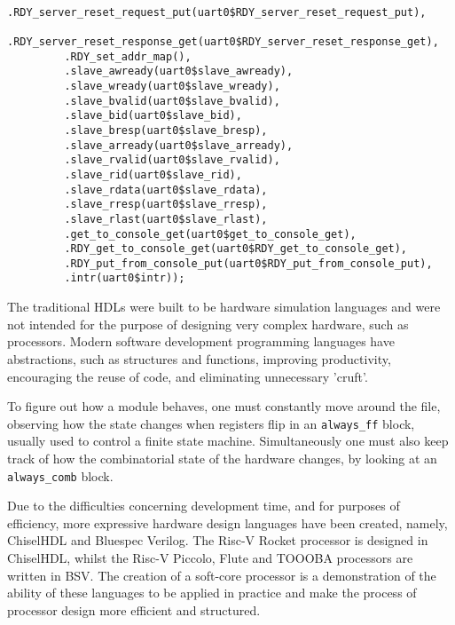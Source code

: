 \documentclass[a4paper,8pt]{report}
\begin{document}
\begin{verbatim}
         .RDY_server_reset_request_put(uart0$RDY_server_reset_request_put),
         .RDY_server_reset_response_get(uart0$RDY_server_reset_response_get),
         .RDY_set_addr_map(),
         .slave_awready(uart0$slave_awready),
         .slave_wready(uart0$slave_wready),
         .slave_bvalid(uart0$slave_bvalid),
         .slave_bid(uart0$slave_bid),
         .slave_bresp(uart0$slave_bresp),
         .slave_arready(uart0$slave_arready),
         .slave_rvalid(uart0$slave_rvalid),
         .slave_rid(uart0$slave_rid),
         .slave_rdata(uart0$slave_rdata),
         .slave_rresp(uart0$slave_rresp),
         .slave_rlast(uart0$slave_rlast),
         .get_to_console_get(uart0$get_to_console_get),
         .RDY_get_to_console_get(uart0$RDY_get_to_console_get),
         .RDY_put_from_console_put(uart0$RDY_put_from_console_put),
         .intr(uart0$intr));
\end{verbatim}
\normalsize

The traditional HDLs were built to be hardware simulation languages and were not
intended for the purpose of designing very complex hardware, such as processors.
Modern software development programming languages have abstractions, such as
structures and functions, improving productivity, encouraging the reuse of
code, and eliminating unnecessary 'cruft'.

To figure out how a module behaves, one must constantly move around the file,
observing how the state changes when registers flip in an \texttt{always\_ff}
block, usually used to control a finite state machine. Simultaneously one must
also keep track of how the combinatorial state of the hardware changes, by
looking at an \texttt{always\_comb} block.

Due to the difficulties concerning development time, and for purposes of
efficiency, more expressive hardware design languages have been created, namely,
ChiselHDL and Bluespec Verilog. The Risc-V Rocket processor is designed in
ChiselHDL, whilst the Risc-V Piccolo, Flute and TOOOBA processors are written in
BSV. The creation of a soft-core processor is a demonstration of the ability of
these languages to be applied in practice and make the process of processor
design more efficient and structured.


\end{document}
